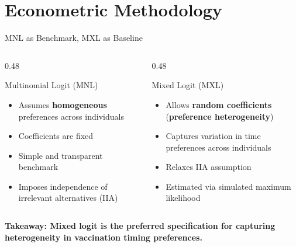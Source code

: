 \documentclass[10pt, aspectratio=169, xcolor={svgnames}]{beamer}
\begin{document}
\section{Econometric Methodology}

\begin{frame}{MNL as Benchmark, MXL as Baseline}
    \begin{columns}[T]
        \begin{column}{0.48\textwidth}
            \begin{block}{Multinomial Logit (MNL)}
                \small
                \begin{itemize}
                    \item Assumes \textbf{homogeneous} preferences across individuals
                    \item Coefficients are fixed
                    \item Simple and transparent benchmark
                    \item Imposes independence of irrelevant alternatives (IIA)
                \end{itemize}
            \end{block}
        \end{column}
        
        \begin{column}{0.48\textwidth}
            \begin{block}{Mixed Logit (MXL)}
                \small
                \begin{itemize}
                    \item Allows \textbf{random coefficients} (\textbf{preference heterogeneity})
                    \item Captures variation in time preferences across individuals
                    \item Relaxes IIA assumption
                    \item Estimated via simulated maximum likelihood
                \end{itemize}
            \end{block}
        \end{column}
    \end{columns}
    
    \vspace{0.8cm}
    \centering
    \textbf{Takeaway: Mixed logit is the preferred specification for capturing heterogeneity in vaccination timing preferences.}
\end{frame}
\end{document}
